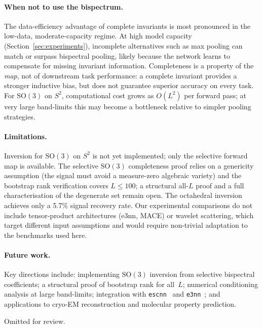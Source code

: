 \documentclass{article}
\theoremstyle{definition}
\theoremstyle{remark}
\newcommand{\SO}{\mathrm{SO}}
\theoremstyle{definition}
\begin{document}
\paragraph{When not to use the bispectrum.}
The data-efficiency advantage of complete invariants is most pronounced
in the low-data, moderate-capacity regime.
At high model capacity (Section~\ref{sec:experiments}), incomplete
alternatives such as max pooling can match or surpass bispectral pooling,
likely because the network learns to compensate for missing invariant
information.
Completeness is a property of the \emph{map}, not of downstream task
performance: a complete invariant provides a stronger inductive bias,
but does not guarantee superior accuracy on every task.
For $\SO(3)$ on $S^2$, computational cost grows as $O(L^2)$ per forward
pass; at very large band-limits this may become a bottleneck relative
to simpler pooling strategies.

\paragraph{Limitations.}
Inversion for $\SO(3)$ on $S^2$ is not yet implemented; only the
selective forward map is available. The selective $\SO(3)$ completeness
proof relies on a genericity assumption (the signal must avoid a
measure-zero algebraic variety) and the bootstrap rank verification
covers $L \le 100$; a structural all-$L$ proof and a full
characterisation of the degenerate set remain open.
The octahedral inversion achieves only a 5.7\% signal recovery rate.
Our experimental comparisons do not include tensor-product
architectures (e3nn, MACE) or wavelet scattering, which target
different input assumptions and would require non-trivial adaptation
to the benchmarks used here.

\paragraph{Future work.}
Key directions include: implementing $\SO(3)$ inversion from selective
bispectral coefficients; a structural proof of bootstrap rank for all~$L$;
numerical conditioning analysis at large
band-limits; integration with \texttt{escnn}~\citep{cesa2022program} and
\texttt{e3nn}~\citep{geiger2022e3nn}; and applications to cryo-EM
reconstruction and molecular property prediction.

\begin{ack}
Omitted for review.
\end{ack}
\end{document}
